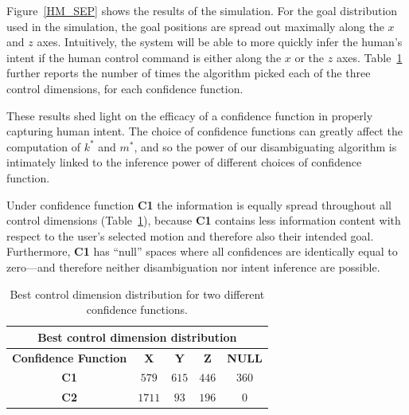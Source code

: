 \documentclass[conference]{IEEEtran}
\begin{document}
Figure~\ref{HM_SEP} shows the results of the simulation. For the goal
distribution used in the simulation, the goal positions are
spread out maximally along the $x$ and $z$ axes. Intuitively, the
system will be able to more quickly infer the human's intent if the
human control command is either along the $x$ or the $z$ axes. Table~\ref{HMD} further
reports the number of times the algorithm picked each of the
three control dimensions, for each confidence function.

These results shed light on the efficacy of a confidence
function in properly capturing human intent. The choice of confidence
functions can greatly affect the
computation of $k^*$ and $m^*$, and so the power of our disambiguating
algorithm is intimately linked to the inference power of different
choices of confidence function.

Under confidence function \textbf{C1} the information is
equally spread throughout all control dimensions (Table~\ref{HMD}),
because \textbf{C1} contains less information content with respect to
the user's selected motion and therefore also their intended
goal. Furthermore, \textbf{C1} has ``null'' spaces where all confidences
are identically equal to zero---and therefore neither disambiguation nor intent inference are possible.

\begin{table}[t]
	\centering
	\begin{tabular}{|c|c|c|c|c|}
		\hline
		\multicolumn{5}{|c|}{Best control dimension distribution} \\
		\hline
		\textbf{Confidence Function} & \textbf{X} & \textbf{Y} & \textbf{Z} & \textbf{NULL} \\ \hline
		
		\textbf{C1} & $579$ & $615$ & $446$ & $360$ \\ \hline
		\textbf{C2} & $1711$ & $93$ & $196$ & $0$\\ \hline
		
	\end{tabular}
	\vspace{.2cm}
	\caption{Best control dimension distribution for two different confidence functions.} 
	\label{HMD}
	\vspace{-.5cm}
\end{table}
\end{document}
